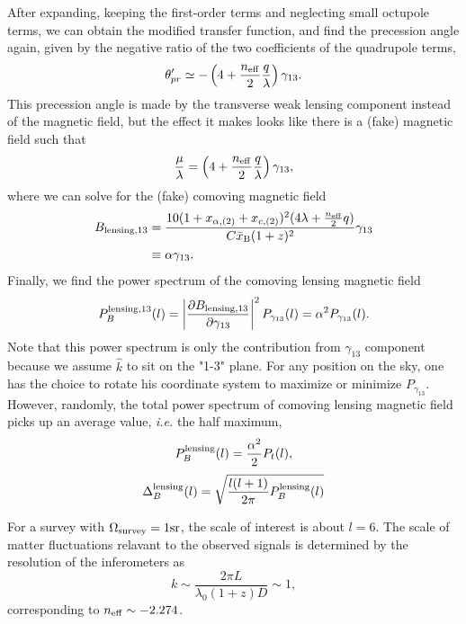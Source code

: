 \documentclass[aps,prd,twocolumn,floatfix,showpacs,superscriptaddress,nofootinbib]{revtex4-1}
\newcommand{\ie}{{\it i.e. }}
\begin{document}
After expanding, keeping the first-order terms and neglecting small octupole terms, we can obtain the modified transfer function, and find the precession angle again, given by the negative ratio of the two coefficients of the quadrupole terms,
\begin{equation}
\theta_{pr}'\simeq-\left(4+\frac{n_{\rm eff}}{2}\frac{q}{\lambda}\right)\gamma_{13}.
\end{equation}
This precession angle is made by the transverse weak lensing component instead of the magnetic field, but the effect it makes looks like there is a (fake) magnetic field such that
\begin{equation}
\frac{\mu}{\lambda}=\left(4+\frac{n_{\rm eff}}{2}\frac{q}{\lambda}\right)\gamma_{13},
\end{equation}
where we can solve for the (fake) comoving magnetic field
\begin{align}
B_{\rm lensing,13}&=\frac{10(1+x_{\alpha,(2)}+x_{c,(2)})^2(4\lambda+\frac{n_{\rm eff}}{2}q)}{C\bar{x}_{\rm B}(1+z)^2}\gamma_{13}\nonumber\\
&\equiv\alpha\gamma_{13}.
\end{align}
Finally, we find the power spectrum of the comoving lensing magnetic field
\begin{equation}
P_B^{\rm lensing,13}(l)=\left\vert\frac{\partial B_{\rm lensing,13}}{\partial\gamma_{13}}\right\vert^2 P_{\gamma_{13}}(l)=\alpha^2 P_{\gamma_{13}}(l).
\end{equation}
Note that this power spectrum is only the contribution from $\gamma_{13}$ component because we assume $\hat{k}$ to sit on the "1-3" plane. For any position on the sky, one has the choice to rotate his coordinate system to maximize or minimize $P_{\gamma_{13}}$. However, randomly, the total power spectrum of comoving lensing magnetic field picks up an average value, \ie the half maximum,
\begin{equation}
P_B^{\rm lensing}(l)=\frac{\alpha^2}{2} P_t(l),
\end{equation}
\begin{equation}
\Delta_{B}^{\rm lensing}(l)=\sqrt{\frac{l(l+1)}{2\pi}P_B^{\rm lensing}(l)}
\end{equation}

For a survey with $\Omega_{\rm survey}=1{\rm sr}$, the scale of interest is about $l=6$. The scale of matter fluctuations relavant to the observed signals is determined by the resolution of the inferometers as
\begin{equation}
k\sim \frac{2\pi L}{\lambda_0(1+z)D}\sim 1,
\end{equation}
corresponding to $n_{\rm eff}\sim -2.274$.
\end{document}
